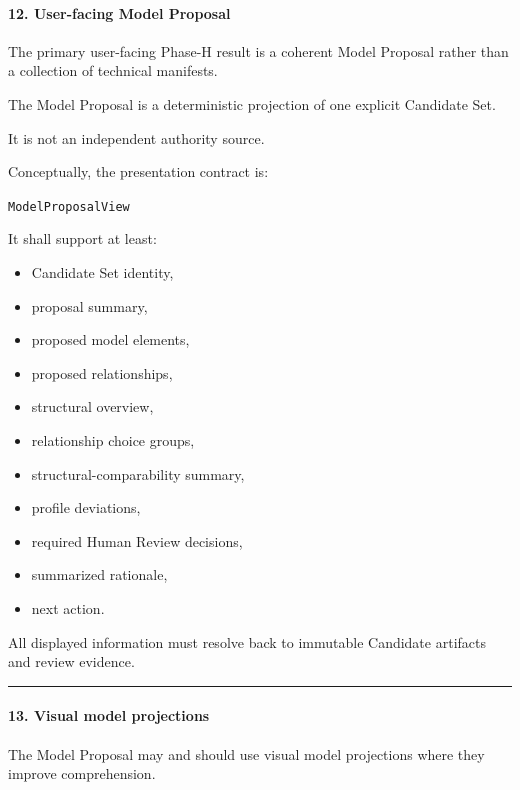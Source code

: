 \hypertarget{12-user-facing-model-proposal}{%
\paragraph{12. User-facing Model Proposal}\label{12-user-facing-model-proposal}}

The primary user-facing Phase-H result is a coherent Model Proposal rather than a collection of technical manifests.

The Model Proposal is a deterministic projection of one explicit Candidate Set.

It is not an independent authority source.

Conceptually, the presentation contract is:

\texttt{ModelProposalView}

It shall support at least:

\begin{itemize}
\tightlist
\item
  Candidate Set identity,
\item
  proposal summary,
\item
  proposed model elements,
\item
  proposed relationships,
\item
  structural overview,
\item
  relationship choice groups,
\item
  structural-comparability summary,
\item
  profile deviations,
\item
  required Human Review decisions,
\item
  summarized rationale,
\item
  next action.
\end{itemize}

All displayed information must resolve back to immutable Candidate artifacts and review evidence.

\begin{center}\rule{0.5\linewidth}{0.5pt}\end{center}

\hypertarget{13-visual-model-projections}{%
\paragraph{13. Visual model projections}\label{13-visual-model-projections}}

The Model Proposal may and should use visual model projections where they improve comprehension.


